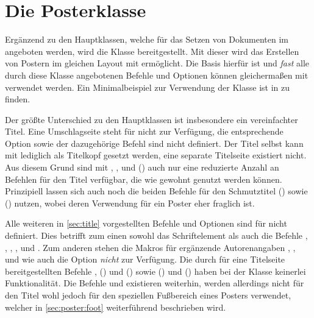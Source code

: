 \chapter[Die Posterklasse \Class*{tudscrposter}]{Die Posterklasse}
%
\begin{Bundle*}{}
%
%
Ergänzend zu den Hauptklassen, welche für das Setzen von Dokumenten im \TUDCD 
angeboten werden, wird die Klasse  bereitgestellt. Mit 
dieser wird das Erstellen von Postern im gleichen Layout mit  
ermöglicht. Die Basis hierfür ist  und \emph{fast} alle 
durch diese Klasse angebotenen Befehle und Optionen können gleichermaßen mit 
 verwendet werden. Ein Minimalbeispiel zur Verwendung der 
Klasse ist in  zu finden.

Der größte Unterschied zu den Hauptklassen ist insbesondere ein vereinfachter 
Titel. Eine Umschlagseite steht für  nicht zur Verfügung, 
die entsprechende Option  sowie der dazugehörige Befehl 
 sind nicht definiert. Der Titel selbst kann mit 
 lediglich als Titelkopf gesetzt werden, eine separate 
Titelseite existiert nicht. Aus diesem Grund sind mit  , 
,  und () 
auch nur eine reduzierte Anzahl an Befehlen für den Titel verfügbar, die wie 
gewohnt genutzt werden können. Prinzipiell lassen sich auch noch die beiden 
Befehle für den Schmutztitel () sowie 
() nutzen, wobei deren Verwendung für 
ein Poster eher fraglich ist.

Alle weiteren in \autoref{sec:title} vorgestellten Befehle und Optionen sind 
für  nicht definiert. Dies betrifft zum einen sowohl das 
Schriftelement  als auch die Befehle , 
, , ,  und  
. Zum anderen stehen die Makros für ergänzende 
Autorenangaben , , 
 und  wie auch 
die Option  \emph{nicht} zur Verfügung. Die durch 
\KOMAScript{} für eine Titelseite bereitgestellten Befehle 
, () und 
() sowie 
() und 
() haben bei der Klasse 
 keinerlei Funktionalität. Die Befehle  und 
 existieren weiterhin, werden allerdings nicht für den Titel 
wohl jedoch für den speziellen Fußbereich eines Posters verwendet, welcher in 
\autoref{sec:poster:foot} weiterführend beschrieben wird.


\end{Bundle*}
